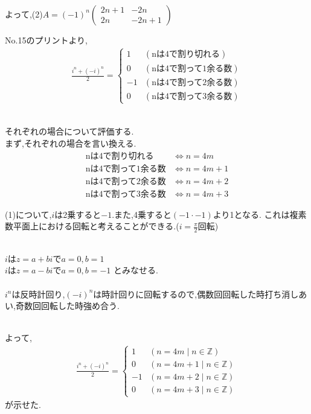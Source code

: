 \documentclass{jsarticle}
\begin{document}
\leavevmode\\
\raggedleft よって,(2)$A = (-1)^n\begin{pmatrix}2n+1&-2n\\2n&-2n+1\end{pmatrix}$

\newpage
\raggedright No.15のプリントより,
\begin{align*}
\frac{i^n+(-i)^n}{2}=\begin{cases}
  1        & (\text{nは4で割り切れる})\\
  0        & (\text{nは4で割って1余る数})\\
  -1       & (\text{nは4で割って2余る数})\\
  0        & (\text{nは4で割って3余る数})
\end{cases}
\end{align*}  

\leavevmode\\
それぞれの場合について評価する.
\leavevmode\\
まず,それぞれの場合を言い換える.
\begin{align}
  \text{nは4で割り切れる}&\Leftrightarrow n=4m\\
  \text{nは4で割って1余る数}&\Leftrightarrow n=4m+1\\
  \text{nは4で割って2余る数}&\Leftrightarrow n=4m+2\\
  \text{nは4で割って3余る数}&\Leftrightarrow n=4m+3
\end{align}
  
(1)について,$i$は2乗すると$-1$.また,4乗すると$(-1\cdot-1)$より1となる.
これは複素数平面上における回転と考えることができる.($i=\frac{\pi}{2}$回転)

\leavevmode\\
$i$は$z=a+bi$で$a=0,b=1$\\
$i$は$z=a-bi$で$a=0,b=-1$ \qquad とみなせる.\\

\leavevmode\\
$i^n$は反時計回り,$(-i)^n$は時計回りに回転するので,偶数回回転した時打ち消しあい,奇数回回転した時強め合う.

\leavevmode\\
よって,
\begin{align*}
  \frac{i^n+(-i)^n}{2}=\begin{cases}
    1        & (n=4m\mid n\in  \mathbb{Z} )\\
    0        & (n=4m+1\mid n\in  \mathbb{Z} )\\
    -1       & (n=4m+2\mid n\in  \mathbb{Z} )\\
    0        & (n=4m+3\mid n\in  \mathbb{Z} )
  \end{cases}
\end{align*}
が示せた.
\end{document}

